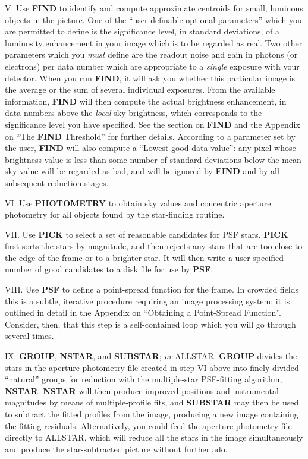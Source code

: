\item{V.} Use {\bf FIND} to identify and compute approximate centroids
for small, luminous objects in the picture.  One of the
``user-definable optional parameters'' which you are permitted to
define is the significance level, in standard deviations, of a
luminosity enhancement in your image which is to be regarded as real.
Two other parameters which you {\it must\/} define are the readout
noise and gain in photons (or electrons) per data number which are
appropriate to a {\it single\/} exposure with your detector.  When you
run {\bf FIND}, it will ask you whether this particular image is the
average or the sum of several individual exposures.  From the available
information, {\bf FIND} will then compute the actual brightness
enhancement, in data numbers above the {\it local\/} sky brightness,
which corresponds to the significance level you have specified.  See
the section on {\bf FIND} and the Appendix on ``The {\bf FIND}
Threshold'' for further details.  According to a parameter set by the
user, {\bf FIND} will also compute a ``Lowest good data-value'':  any
pixel whose brightness value is less than some number of standard
deviations below the mean sky value will be regarded as bad, and will
be ignored by {\bf FIND} and by all subsequent reduction stages.

\item{VI.} Use {\bf PHOTOMETRY} to obtain sky values and concentric
aperture photometry for all objects found by the star-finding routine. 

\item{VII.} Use {\bf PICK} to select a set of reasonable candidates for
PSF stars.  {\bf PICK} first sorts the stars by magnitude, and then
rejects any stars that are too close to the edge of the frame or to a
brighter star.  It will then write a user-specified number of good
candidates to a disk file for use by {\bf PSF}.

\item{VIII.} Use {\bf PSF} to define a point-spread function for the
frame.  In crowded fields this is a subtle, iterative procedure
requiring an image processing system; it is outlined in detail in the
Appendix on ``Obtaining a Point-Spread Function''.  Consider, then,
that this step is a self-contained loop which you will go through
several times.

\item{IX.}  {\bf GROUP}, {\bf NSTAR}, and {\bf SUBSTAR}; {\it or\/}
ALLSTAR.  {\bf GROUP} divides the stars in the
aperture-photometry file created in step VI above into finely divided
``natural'' groups for reduction with the multiple-star PSF-fitting
algorithm, \hbox{\bf NSTAR}. {\bf NSTAR} will then produce improved
positions and instrumental magnitudes by means of multiple-profile
fits, and {\bf SUBSTAR} may then be used to subtract the fitted
profiles from the image, producing a new image containing the fitting
residuals.  Alternatively, you could feed the aperture-photometry file
directly to ALLSTAR, which will reduce all the stars in the image
simultaneously and produce the star-subtracted picture without further
ado.

